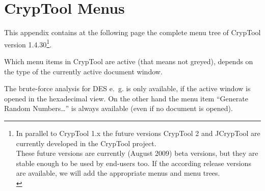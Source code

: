 
\newpage
\enlargethispage{1cm}
\hypertarget{appendix-menutree}{}
\section{CrypTool Menus}
\label{s:appendix-menutree}

This appendix contains at the following page the complete menu tree of
CrypTool version 1.4.30\footnote{%
  In parallel to CrypTool 1.x the future versions
  CrypTool 2 and JCrypTool
  are currently developed in the CrypTool project.\\
  These future versions are currently (August 2009) beta versions, but they
  are stable enough to be used by end-users too. If the according release
  versions are available, we will add the appropriate menus and menu trees.\\
}. 

Which menu items in CrypTool are active (that means not greyed), depends on
the type of the currently active document window.

The brute-force analysis for DES e.~g. is only
available, if the active window is opened in the hexadecimal view. 
On the other hand the menu item ``Generate Random Numbers\dots''
is always available (even if no document is opened).



